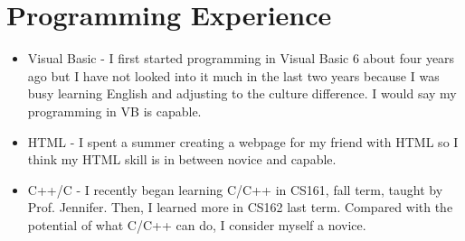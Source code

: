 \documentclass{article}
\begin{document}
\section{Programming Experience}
\begin{itemize}
\item Visual Basic - I first started programming in Visual Basic 6 about four years ago but I have not looked into it much in the last two years because I was busy learning English and adjusting to the culture difference. I would say my programming in VB is capable. 
\item HTML - I spent a summer creating a webpage for my friend with HTML so I think  my HTML skill is in between novice and capable.
\item C++/C - I recently began learning C/C++ in CS161, fall term, taught by Prof. Jennifer.  Then, I learned more in CS162 last term. Compared with the potential of what C/C++ can do, I consider myself a novice.


\end{itemize}




\end{document}
